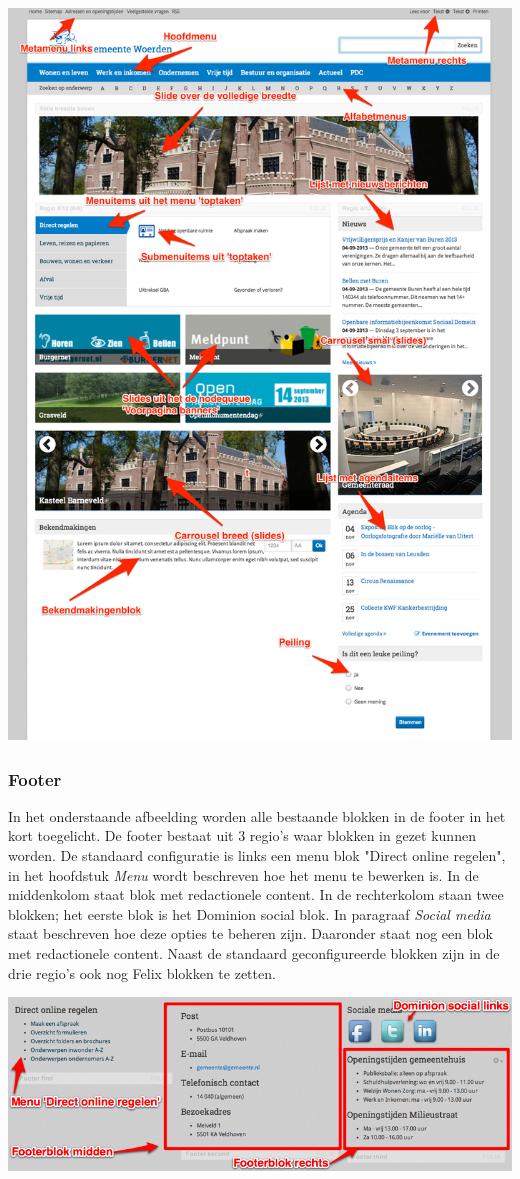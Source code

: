\begin{center}
	\includegraphics[width=\textwidth]{img/voorpagina.png}
\end{center}

\subsubsection{Footer}

In het onderstaande afbeelding worden alle bestaande blokken in de footer in het kort toegelicht. De footer bestaat uit 3 regio's waar blokken in gezet kunnen worden. De standaard configuratie is links een menu blok "Direct online regelen", in het hoofdstuk \emph{Menu} wordt beschreven hoe het menu te bewerken is. In de middenkolom staat blok met redactionele content. In de rechterkolom staan twee blokken; het eerste blok is het Dominion social blok. In paragraaf \emph{Social media} staat beschreven hoe deze opties te beheren zijn. Daaronder staat nog een blok met redactionele content. Naast de standaard geconfigureerde blokken zijn in de drie regio's ook nog Felix blokken te zetten. 

\bigskip

\begin{center}
	\includegraphics[width=\textwidth]{img/voorpagina3.png}
\end{center}